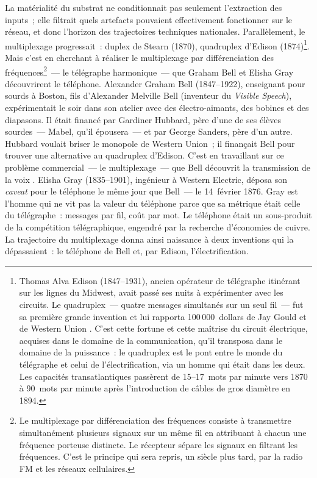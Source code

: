 La matérialité du substrat ne conditionnait pas seulement l'extraction des inputs~; elle filtrait quels artefacts pouvaient effectivement fonctionner sur le réseau, et donc l'horizon des trajectoires techniques nationales. Parallèlement, le multiplexage progressait~: duplex de Stearn (1870), quadruplex d'Edison (1874)\footnote{Thomas Alva Edison (1847--1931), ancien opérateur de télégraphe itinérant sur les lignes du Midwest, avait passé ses nuits à expérimenter avec les circuits. Le quadruplex~--- quatre messages simultanés sur un seul fil~--- fut sa première grande invention et lui rapporta 100\,000~dollars de Jay Gould et de Western Union \parencite{kooij_telegraph_2015}. C'est cette fortune et cette maîtrise du circuit électrique, acquises dans le domaine de la communication, qu'il transposa dans le domaine de la puissance~: le quadruplex est le pont entre le monde du télégraphe et celui de l'électrification, via un homme qui était dans les deux. Les capacités transatlantiques passèrent de 15--17~mots par minute vers 1870 à 90~mots par minute après l'introduction de câbles de gros diamètre en 1894.}. Mais c'est en cherchant à réaliser le multiplexage par différenciation des fréquences\footnote{Le multiplexage par différenciation des fréquences consiste à transmettre simultanément plusieurs signaux sur un même fil en attribuant à chacun une fréquence porteuse distincte. Le récepteur sépare les signaux en filtrant les fréquences. C'est le principe qui sera repris, un siècle plus tard, par la radio FM et les réseaux cellulaires.}~--- le \og télégraphe harmonique\fg{}~--- que Graham Bell et Elisha Gray découvrirent le téléphone. Alexander Graham Bell (1847--1922), enseignant pour sourds à Boston, fils d'Alexander Melville Bell (inventeur du \emph{Visible Speech}), expérimentait le soir dans son atelier avec des électro-aimants, des bobines et des diapasons. Il était financé par Gardiner Hubbard, père d'une de ses élèves sourdes~--- Mabel, qu'il épousera~--- et par George Sanders, père d'un autre. Hubbard voulait briser le monopole de Western Union~; il finançait Bell pour trouver une alternative au quadruplex d'Edison. C'est en travaillant sur ce problème commercial~--- le multiplexage~--- que Bell découvrit la transmission de la voix \parencite{kooij_telephone_2016}. Elisha Gray (1835--1901), ingénieur à Western Electric, déposa son \emph{caveat} pour le téléphone le même jour que Bell~--- le 14~février 1876. Gray est l'homme qui ne vit pas la valeur du téléphone parce que sa métrique était celle du télégraphe~: messages par fil, coût par mot. Le téléphone était un sous-produit de la compétition télégraphique, engendré par la recherche d'économies de cuivre. %
La trajectoire du multiplexage donna ainsi naissance à deux inventions qui la dépassaient~: le téléphone de Bell et, par Edison, l'électrification.

